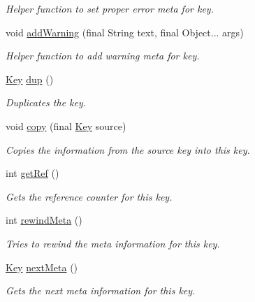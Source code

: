 \begin{DoxyCompactItemize}
\begin{DoxyCompactList}\small\item\em Helper function to set proper error meta for key. \end{DoxyCompactList}\item 
void \hyperlink{classorg_1_1libelektra_1_1Key_a542a69d75c304dda3f78cb3b185022ee}{add\+Warning} (final String text, final Object... args)
\begin{DoxyCompactList}\small\item\em Helper function to add warning meta for key. \end{DoxyCompactList}\item 
\hyperlink{classorg_1_1libelektra_1_1Key}{Key} \hyperlink{classorg_1_1libelektra_1_1Key_a67a839951aa9bc48f8ffbb1ebcdfb819}{dup} ()
\begin{DoxyCompactList}\small\item\em Duplicates the key. \end{DoxyCompactList}\item 
void \hyperlink{classorg_1_1libelektra_1_1Key_abe0bb2790e29c52c12fec86a73818626}{copy} (final \hyperlink{classorg_1_1libelektra_1_1Key}{Key} source)
\begin{DoxyCompactList}\small\item\em Copies the information from the source key into this key. \end{DoxyCompactList}\item 
int \hyperlink{classorg_1_1libelektra_1_1Key_a3672b9c763ac97d78317b3d54a370107}{get\+Ref} ()
\begin{DoxyCompactList}\small\item\em Gets the reference counter for this key. \end{DoxyCompactList}\item 
int \hyperlink{classorg_1_1libelektra_1_1Key_aea5c4a3a24237dca57e55beca85db0be}{rewind\+Meta} ()
\begin{DoxyCompactList}\small\item\em Tries to rewind the meta information for this key. \end{DoxyCompactList}\item 
\hyperlink{classorg_1_1libelektra_1_1Key}{Key} \hyperlink{classorg_1_1libelektra_1_1Key_ace2853c3ca003e9099272871a6d61ad6}{next\+Meta} ()
\begin{DoxyCompactList}\small\item\em Gets the next meta information for this key. \end{DoxyCompactList}\item 

\end{DoxyCompactItemize}
